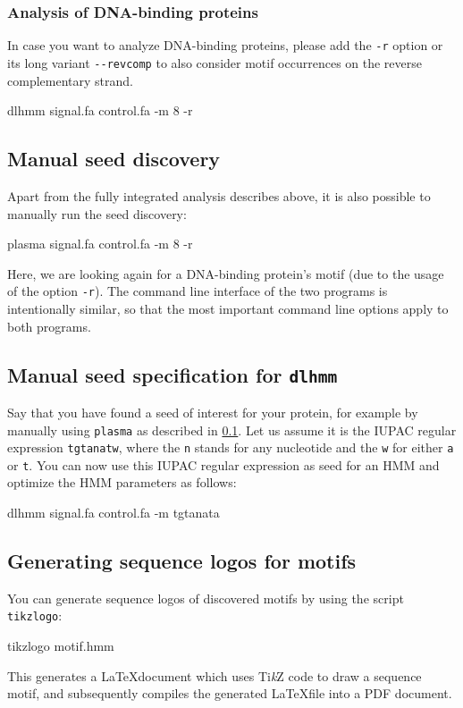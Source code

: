 \documentclass[a4paper]{article}
\newcommand{\plasma}[0]{\texttt{plasma}}
\newcommand{\dlhmm}[0]{\texttt{dlhmm}}
\newcommand{\TikZ}{Ti\emph{k}Z}
\begin{document}
\subsubsection{Analysis of DNA-binding proteins}
In case you want to analyze DNA-binding proteins, please add the \verb|-r| option or its long variant \verb|--revcomp| to also consider motif occurrences on the reverse complementary strand.\\
\begin{verbbox}
dlhmm signal.fa control.fa -m 8 -r
\end{verbbox}
\fbox{\theverbbox[t]}

\subsection{Manual seed discovery}
\label{tutorial:plasma}
Apart from the fully integrated analysis describes above, it is also possible to manually run the seed discovery:\\
\begin{verbbox}
plasma signal.fa control.fa -m 8 -r
\end{verbbox}
\fbox{\theverbbox[t]}
Here, we are looking again for a DNA-binding protein's motif (due to the usage of the option \verb|-r|).
The command line interface of the two programs is intentionally similar, so that the most important command line options apply to both programs.

\subsection{Manual seed specification for \dlhmm{}}
Say that you have found a seed of interest for your protein, for example by manually using \plasma{} as described in \cref{tutorial:plasma}.
Let us assume it is the IUPAC regular expression \verb|tgtanatw|, where the \verb|n| stands for any nucleotide and the \verb|w| for either \verb|a| or \verb|t|.
You can now use this IUPAC regular expression as seed for an HMM and optimize the HMM parameters as follows:\\
\begin{verbbox}
dlhmm signal.fa control.fa -m tgtanata
\end{verbbox}
\fbox{\theverbbox[t]}


\subsection{Generating sequence logos for motifs}
You can generate sequence logos of discovered motifs by using the script \verb|tikzlogo|:\\
\begin{verbbox}
tikzlogo motif.hmm
\end{verbbox}
\fbox{\theverbbox[t]}
This generates a \LaTeX document which uses \TikZ{} code to draw a sequence motif, and subsequently compiles the generated \LaTeX file into a PDF document.
\end{document}
